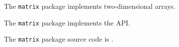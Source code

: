 
The {\tt matrix} package implements two-dimensional arrays.

The {\tt matrix} package implements the  API.

The {\tt matrix} package source code is .



